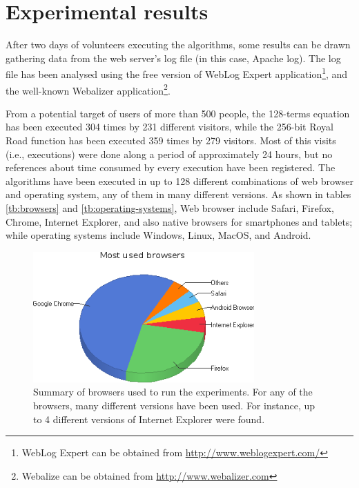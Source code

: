 \documentclass[runningheads,a4paper]{llncs}
\begin{document}
  	




\section{Experimental results}
\label{sec:exp}

After two days of volunteers executing the algorithms, some results can be drawn gathering data from the web server's log file (in this case, Apache log). The log file has been analysed using the free version of WebLog Expert application\footnote{WebLog Expert can be obtained from \url{http://www.weblogexpert.com/}}, and the well-known Webalizer application\footnote{Webalize can be obtained from \url{http://www.webalizer.com}}.

From a potential target of users of more than 500 people, the 128-terms equation has been executed 304 times by 231 different visitors, while the 256-bit Royal Road function has been executed 359 times by 279 visitors. Most of this visits (i.e., executions) were done along a period of approximately 24 hours, but no references about time consumed by every execution have been registered. The algorithms have been executed in up to 128 different combinations of web browser and operating system, any of them in many different versions. As shown in tables \ref{tb:browsers} and \ref{tb:operating-systems}, Web browser include Safari, Firefox, Chrome, Internet Explorer, and also native browsers for smartphones and tablets; while operating systems include Windows, Linux, MacOS, and Android.

\begin{figure}
\centering
\includegraphics[height=5cm]{Most_Used_Browsers}
\caption{Summary of browsers used to run the experiments. For any of the browsers, many different versions have been used. For instance, up to 4 different versions of Internet Explorer were found.}
\label{fig:jsEO-str}
\end{figure}
\end{document}
